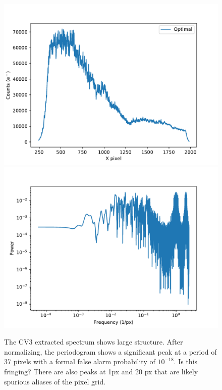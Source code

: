 \documentclass[]{aastex62}
\begin{document}
\begin{figure}[!hbtp]
\centering
\includegraphics[width=.49\columnwidth]{labLED_ind_spec_CV3NRCN036810.pdf}
\includegraphics[width=.49\columnwidth]{labLED_spec_periodo_CV3NRCN036810.pdf}
\caption{The CV3 extracted spectrum shows large structure.
After normalizing, the periodogram shows a significant peak at a period of 37 pixels with a formal false alarm probability of $10^{-18}$.
Is this fringing?
There are also peaks at 1px and 20 px that are likely spurious aliases of the pixel grid.}\label{fig:cv3ExtractedSpectrum}
\end{figure}


%

\vspace{5mm}

\end{document}
